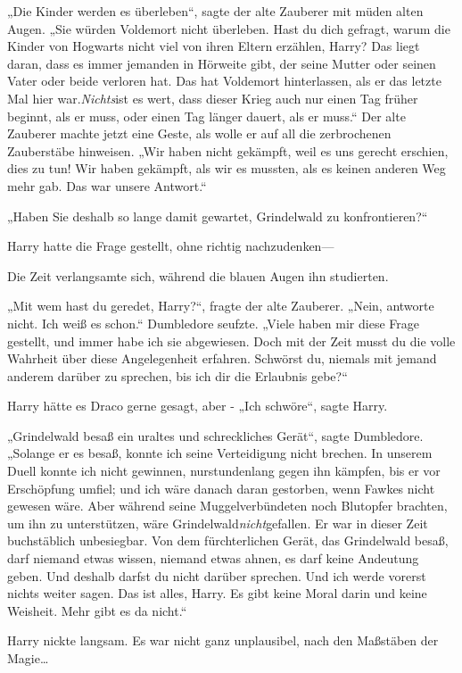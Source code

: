 {„Die Kinder werden es überleben“, sagte der alte Zauberer mit müden alten Augen. „Sie würden Voldemort nicht überleben. Hast du dich gefragt, warum die Kinder von Hogwarts nicht viel von ihren Eltern erzählen, Harry? Das liegt daran, dass es immer jemanden in Hörweite gibt, der seine Mutter oder seinen Vater oder beide verloren hat. Das hat Voldemort hinterlassen, als er das letzte Mal hier war.\emph{Nichts}ist es wert, dass dieser Krieg auch nur einen Tag früher beginnt, als er muss, oder einen Tag länger dauert, als er muss.“ Der alte Zauberer machte jetzt eine Geste, als wolle er auf all die zerbrochenen Zauberstäbe hinweisen. „Wir haben nicht gekämpft, weil es uns gerecht erschien, dies zu tun! Wir haben gekämpft, als wir es mussten, als es keinen anderen Weg mehr gab. Das war unsere Antwort.“

„Haben Sie deshalb so lange damit gewartet, Grindelwald zu konfrontieren?“

Harry hatte die Frage gestellt, ohne richtig nachzudenken—

Die Zeit verlangsamte sich, während die blauen Augen ihn studierten.

„Mit wem hast du geredet, Harry?“, fragte der alte Zauberer. „Nein, antworte nicht. Ich weiß es schon.“ Dumbledore seufzte. „Viele haben mir diese Frage gestellt, und immer habe ich sie abgewiesen. Doch mit der Zeit musst du die volle Wahrheit über diese Angelegenheit erfahren. Schwörst du, niemals mit jemand anderem darüber zu sprechen, bis ich dir die Erlaubnis gebe?“

Harry hätte es Draco gerne gesagt, aber - „Ich schwöre“, sagte Harry.

„Grindelwald besaß ein uraltes und schreckliches Gerät“, sagte Dumbledore. „Solange er es besaß, konnte ich seine Verteidigung nicht brechen. In unserem Duell konnte ich nicht gewinnen, nurstundenlang gegen ihn kämpfen, bis er vor Erschöpfung umfiel; und ich wäre danach daran gestorben, wenn Fawkes nicht gewesen wäre. Aber während seine Muggelverbündeten noch Blutopfer brachten, um ihn zu unterstützen, wäre Grindelwald\emph{nicht}gefallen. Er war in dieser Zeit buchstäblich unbesiegbar. Von dem fürchterlichen Gerät, das Grindelwald besaß, darf niemand etwas wissen, niemand etwas ahnen, es darf keine Andeutung geben. Und deshalb darfst du nicht darüber sprechen. Und ich werde vorerst nichts weiter sagen. Das ist alles, Harry. Es gibt keine Moral darin und keine Weisheit. Mehr gibt es da nicht.“

Harry nickte langsam. Es war nicht ganz unplausibel, nach den Maßstäben der Magie…

}
